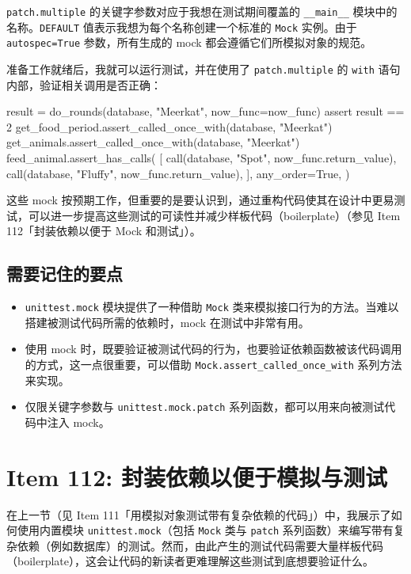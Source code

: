 \texttt{patch.multiple} 的关键字参数对应于我想在测试期间覆盖的 \texttt{\_\_main\_\_} 模块中的名称。\texttt{DEFAULT} 值表示我想为每个名称创建一个标准的 \texttt{Mock} 实例。由于 \texttt{autospec=True} 参数，所有生成的 mock 都会遵循它们所模拟对象的规范。

准备工作就绪后，我就可以运行测试，并在使用了 \texttt{patch.multiple} 的 \texttt{with} 语句内部，验证相关调用是否正确：

\begin{codebox}[python]
    result = do_rounds(database, "Meerkat", now_func=now_func)
    assert result == 2
    get_food_period.assert_called_once_with(database, "Meerkat")
    get_animals.assert_called_once_with(database, "Meerkat")
    feed_animal.assert_has_calls(
        [
            call(database, "Spot", now_func.return_value),
            call(database, "Fluffy", now_func.return_value),
        ],
        any_order=True,
    )
\end{codebox}

这些 mock 按预期工作，但重要的是要认识到，通过重构代码使其在设计中更易测试，可以进一步提高这些测试的可读性并减少样板代码（boilerplate）（参见 Item 112「封装依赖以便于 Mock 和测试」）。

\subsection{需要记住的要点}

\begin{itemize}
\item \texttt{unittest.mock} 模块提供了一种借助 \texttt{Mock} 类来模拟接口行为的方法。当难以搭建被测试代码所需的依赖时，mock 在测试中非常有用。
\item 使用 mock 时，既要验证被测试代码的行为，也要验证依赖函数被该代码调用的方式，这一点很重要，可以借助 \texttt{Mock.assert\_called\_once\_with} 系列方法来实现。
\item 仅限关键字参数与 \texttt{unittest.mock.patch} 系列函数，都可以用来向被测试代码中注入 mock。
\end{itemize}

\section{Item 112: 封装依赖以便于模拟与测试}

在上一节（见 Item 111「用模拟对象测试带有复杂依赖的代码」）中，我展示了如何使用内置模块 \texttt{unittest.mock}（包括 \texttt{Mock} 类与 \texttt{patch} 系列函数）来编写带有复杂依赖（例如数据库）的测试。然而，由此产生的测试代码需要大量样板代码（boilerplate），这会让代码的新读者更难理解这些测试到底想要验证什么。

